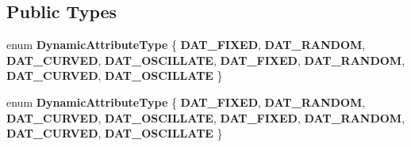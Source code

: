 \subsection*{Public Types}
\begin{DoxyCompactItemize}
\item 
\mbox{\label{classPUDynamicAttribute_a0db8f87bcb4c9c92799347092f8d48dc}} 
enum {\bfseries Dynamic\+Attribute\+Type} \{ \newline
{\bfseries D\+A\+T\+\_\+\+F\+I\+X\+ED}, 
{\bfseries D\+A\+T\+\_\+\+R\+A\+N\+D\+OM}, 
{\bfseries D\+A\+T\+\_\+\+C\+U\+R\+V\+ED}, 
{\bfseries D\+A\+T\+\_\+\+O\+S\+C\+I\+L\+L\+A\+TE}, 
\newline
{\bfseries D\+A\+T\+\_\+\+F\+I\+X\+ED}, 
{\bfseries D\+A\+T\+\_\+\+R\+A\+N\+D\+OM}, 
{\bfseries D\+A\+T\+\_\+\+C\+U\+R\+V\+ED}, 
{\bfseries D\+A\+T\+\_\+\+O\+S\+C\+I\+L\+L\+A\+TE}
 \}
\item 
\mbox{\label{classPUDynamicAttribute_a0db8f87bcb4c9c92799347092f8d48dc}} 
enum {\bfseries Dynamic\+Attribute\+Type} \{ \newline
{\bfseries D\+A\+T\+\_\+\+F\+I\+X\+ED}, 
{\bfseries D\+A\+T\+\_\+\+R\+A\+N\+D\+OM}, 
{\bfseries D\+A\+T\+\_\+\+C\+U\+R\+V\+ED}, 
{\bfseries D\+A\+T\+\_\+\+O\+S\+C\+I\+L\+L\+A\+TE}, 
\newline
{\bfseries D\+A\+T\+\_\+\+F\+I\+X\+ED}, 
{\bfseries D\+A\+T\+\_\+\+R\+A\+N\+D\+OM}, 
{\bfseries D\+A\+T\+\_\+\+C\+U\+R\+V\+ED}, 
{\bfseries D\+A\+T\+\_\+\+O\+S\+C\+I\+L\+L\+A\+TE}
 \}
\end{DoxyCompactItemize}
